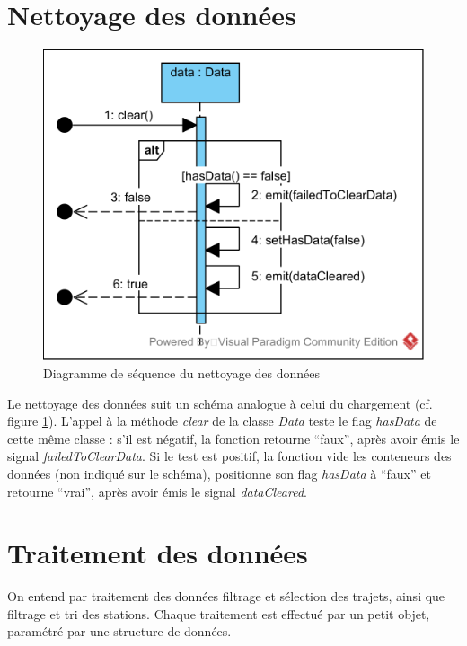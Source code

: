\documentclass[12pt]{article}
\begin{document}
	\section{Nettoyage des données}
	\begin{figure}[!h]
	\begin{center}
	\includegraphics[scale=1]{dia_sequence_clear.png}
	\caption{ Diagramme de séquence du nettoyage des données}
	\label{fig:nettoyage}
	\end{center}
	\end{figure}
	
	Le nettoyage des données suit un schéma analogue à celui du chargement (cf. figure \ref{fig:nettoyage}). L’appel à la méthode \textit{clear} de la classe \textit{Data} teste le flag \textit{hasData} de cette même classe : s’il est négatif, la fonction retourne “faux”, après avoir émis le signal \textit{failedToClearData}. Si le test est positif, la fonction vide les conteneurs des données (non indiqué sur le schéma), positionne son flag \textit{hasData} à “faux” et retourne “vrai”, après avoir émis le signal \textit{dataCleared}.

	\section{Traitement des données}
	On entend par traitement des données filtrage et sélection des trajets, ainsi que filtrage et tri des stations. Chaque traitement est effectué par un petit objet, paramétré par une structure de données.
	
\end{document}
